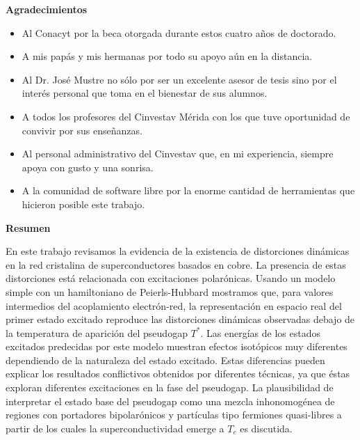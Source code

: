 
\cleardoublepage
{}
{}

\begin{center}
\textbf{\large Agradecimientos}
\end{center}
\vspace{3cm}

\begin{itemize}
    \item Al Conacyt por la beca otorgada durante estos cuatro años de doctorado.
    \item A mis pap\'{a}s y mis hermanas por todo su apoyo a\'{u}n en la distancia.
    \item Al Dr. Jos\'{e} Mustre no s\'{o}lo por ser un excelente asesor de tesis sino por el inter\'{e}s personal que toma en el bienestar de sus alumnos.
    \item A todos los profesores del Cinvestav M\'{e}rida con los que tuve oportunidad de convivir por sus enseñanzas.
    \item Al personal administrativo del Cinvestav que, en mi experiencia, siempre apoya con gusto y una sonrisa.
    \item A la comunidad de software libre por la enorme cantidad de herramientas que hicieron posible este trabajo.
\end{itemize}


\cleardoublepage
{}
{}
\begin{center}
\textbf{\large Resumen}
\end{center}
En este trabajo revisamos la evidencia de la existencia de distorciones din\'{a}micas en la red cristalina de superconductores basados en cobre. 
La presencia de estas distorciones est\'{a} relacionada con excitaciones polar\'{o}nicas. 
Usando un modelo simple con un hamiltoniano de Peierls-Hubbard mostramos que, para valores intermedios del acoplamiento electr\'{o}n-red, la representaci\'{o}n en espacio real del primer estado excitado reproduce las distorciones din\'{a}micas observadas debajo de la temperatura de aparici\'{o}n del pseudogap $T^*$. 
Las energ\'{i}as de los estados excitados predecidas por este modelo muestran efectos isot\'{o}picos muy diferentes dependiendo de la naturaleza del estado excitado. 
Estas diferencias pueden explicar los resultados conflictivos obtenidos por diferentes t\'{e}cnicas, ya que \'{e}stas exploran diferentes excitaciones en la fase del pseudogap. 
La plausibilidad de interpretar el estado base del pseudogap como una mezcla inhonomog\'{e}nea de regiones con portadores bipolar\'{o}nicos y part\'{i}culas tipo fermiones quasi-libres a partir de los cuales la superconductividad emerge a $T_c$ es discutida.

